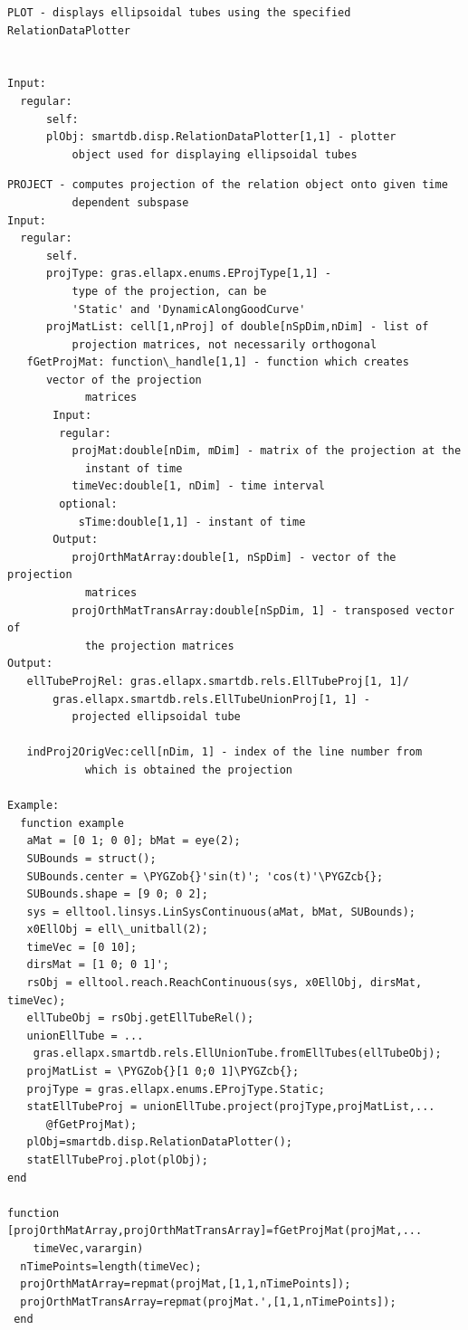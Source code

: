\documentclass[letterpaper,10pt,english]{sphinxmanual}
\def\PYGZob{\char`\{}
\def\PYGZcb{\char`\}}
\begin{document}
\begin{Verbatim}[commandchars=\\\{\}]
PLOT - displays ellipsoidal tubes using the specified RelationDataPlotter


Input:
  regular:
      self:
      plObj: smartdb.disp.RelationDataPlotter[1,1] - plotter
          object used for displaying ellipsoidal tubes
\end{Verbatim}

\begin{Verbatim}[commandchars=\\\{\}]
PROJECT - computes projection of the relation object onto given time
          dependent subspase
Input:
  regular:
      self.
      projType: gras.ellapx.enums.EProjType[1,1] -
          type of the projection, can be
          'Static' and 'DynamicAlongGoodCurve'
      projMatList: cell[1,nProj] of double[nSpDim,nDim] - list of
          projection matrices, not necessarily orthogonal
   fGetProjMat: function\_handle[1,1] - function which creates
      vector of the projection
            matrices
       Input:
        regular:
          projMat:double[nDim, mDim] - matrix of the projection at the
            instant of time
          timeVec:double[1, nDim] - time interval
        optional:
           sTime:double[1,1] - instant of time
       Output:
          projOrthMatArray:double[1, nSpDim] - vector of the projection
            matrices
          projOrthMatTransArray:double[nSpDim, 1] - transposed vector of
            the projection matrices
Output:
   ellTubeProjRel: gras.ellapx.smartdb.rels.EllTubeProj[1, 1]/
       gras.ellapx.smartdb.rels.EllTubeUnionProj[1, 1] -
          projected ellipsoidal tube

   indProj2OrigVec:cell[nDim, 1] - index of the line number from
            which is obtained the projection

Example:
  function example
   aMat = [0 1; 0 0]; bMat = eye(2);
   SUBounds = struct();
   SUBounds.center = \PYGZob{}'sin(t)'; 'cos(t)'\PYGZcb{};
   SUBounds.shape = [9 0; 0 2];
   sys = elltool.linsys.LinSysContinuous(aMat, bMat, SUBounds);
   x0EllObj = ell\_unitball(2);
   timeVec = [0 10];
   dirsMat = [1 0; 0 1]';
   rsObj = elltool.reach.ReachContinuous(sys, x0EllObj, dirsMat, timeVec);
   ellTubeObj = rsObj.getEllTubeRel();
   unionEllTube = ...
    gras.ellapx.smartdb.rels.EllUnionTube.fromEllTubes(ellTubeObj);
   projMatList = \PYGZob{}[1 0;0 1]\PYGZcb{};
   projType = gras.ellapx.enums.EProjType.Static;
   statEllTubeProj = unionEllTube.project(projType,projMatList,...
      @fGetProjMat);
   plObj=smartdb.disp.RelationDataPlotter();
   statEllTubeProj.plot(plObj);
end

function [projOrthMatArray,projOrthMatTransArray]=fGetProjMat(projMat,...
    timeVec,varargin)
  nTimePoints=length(timeVec);
  projOrthMatArray=repmat(projMat,[1,1,nTimePoints]);
  projOrthMatTransArray=repmat(projMat.',[1,1,nTimePoints]);
 end
\end{Verbatim}
\end{document}
